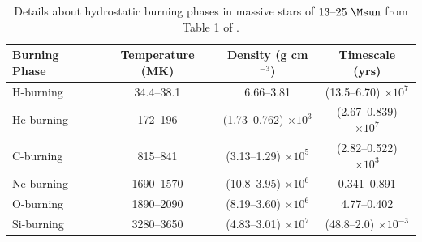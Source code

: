 \begin{table}[!htb]
\caption{Details about hydrostatic burning phases in massive stars of $13\text{--}25 ~\Msun$ from Table 1 of \cite{woosleyEvolutionExplosionMassive2002}. 
}
\label{tab:massivestarsburning}
\begin{tabular}{|l|c|c|c|}
    \hline
    \textbf{Burning Phase} & \textbf{Temperature (MK)} & \textbf{Density (g cm$^{-3}$)} & \textbf{Timescale (yrs)} 
    \\ \hline
    H-burning & 34.4--38.1 & 6.66--3.81 & (13.5--6.70) $\times 10^7$ \\ \hline
    He-burning & 172--196 & (1.73--0.762) $\times 10^3$  & (2.67--0.839) $\times 10^7$ \\ \hline
    C-burning & 815--841 & (3.13--1.29) $\times 10^5$ & (2.82--0.522) $\times 10^3$ \\ \hline
    Ne-burning & 1690--1570  & (10.8--3.95) $\times 10^6$ & 0.341--0.891 \\ \hline
    O-burning & 1890--2090  & (8.19--3.60) $\times 10^6$ & 4.77--0.402 \\ \hline
    Si-burning &  3280--3650 & (4.83--3.01) $\times 10^7$ & (48.8--2.0) $\times 10^{-3}$\\
    \hline
\end{tabular}
\end{table}


